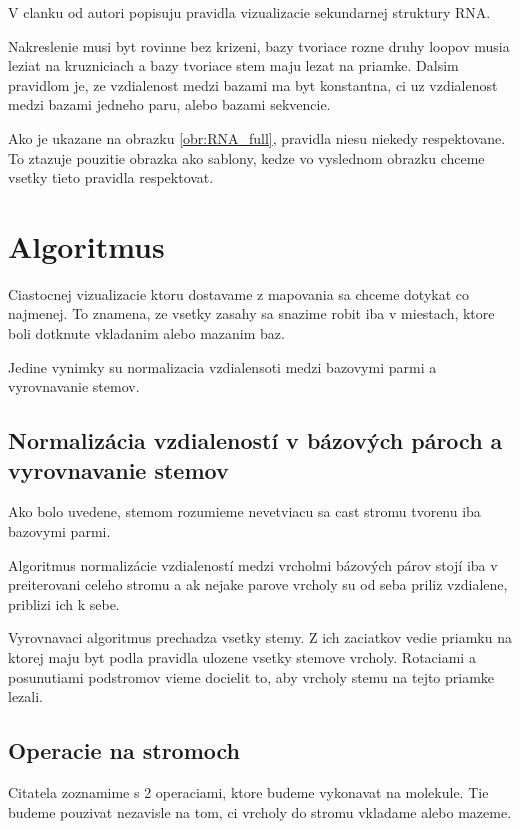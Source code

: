 V clanku od \citet{RNA_DRAW} autori popisuju pravidla vizualizacie sekundarnej struktury RNA.

Nakreslenie musi byt rovinne bez krizeni, bazy tvoriace rozne druhy loopov musia leziat na kruzniciach
a bazy tvoriace stem maju lezat na priamke.
Dalsim pravidlom je, ze vzdialenost medzi bazami ma byt konstantna, ci uz vzdialenost medzi bazami jedneho paru,
alebo bazami sekvencie.

Ako je ukazane na obrazku \ref{obr:RNA_full}, pravidla niesu niekedy respektovane. To ztazuje pouzitie obrazka
ako sablony, kedze vo vyslednom obrazku chceme vsetky tieto pravidla respektovat.

\section{Algoritmus}

Ciastocnej vizualizacie ktoru dostavame z mapovania sa chceme dotykat co najmenej. To znamena,
ze vsetky zasahy sa snazime robit iba v miestach, ktore boli dotknute vkladanim alebo mazanim baz.

Jedine vynimky su normalizacia vzdialensoti medzi bazovymi parmi a vyrovnavanie stemov.

\subsection{Normalizácia vzdialeností v bázových pároch a vyrovnavanie stemov}

Ako bolo uvedene, stemom rozumieme nevetviacu sa cast stromu tvorenu iba bazovymi parmi.

Algoritmus normalizácie vzdialeností medzi vrcholmi bázových párov stojí iba v preiterovani celeho stromu
a ak nejake parove vrcholy su od seba priliz vzdialene, priblizi ich k sebe.

Vyrovnavaci algoritmus prechadza vsetky stemy. Z ich zaciatkov vedie priamku na ktorej maju byt podla pravidla ulozene
vsetky stemove vrcholy. Rotaciami a posunutiami podstromov vieme docielit to, aby vrcholy stemu na tejto priamke lezali.


\subsection{Operacie na stromoch}

Citatela zoznamime s 2 operaciami, ktore budeme vykonavat na molekule. Tie budeme pouzivat nezavisle
na tom, ci vrcholy do stromu vkladame alebo mazeme.

